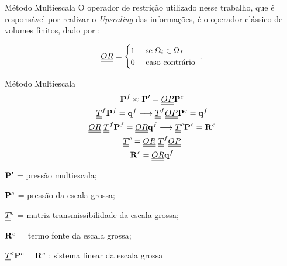 \documentclass[professionalfont]{beamer}
\begin{document}


\begin{frame}{Método Multiescala}
    O operador de restrição utilizado nesse trabalho, que é responsável por realizar o \textit{Upscaling} das informações, é o operador clássico de volumes finitos, dado por \cite{Tene_2016}:

    \begin{equation}
        \label{eq:multiescala.11}
        \underline{\underline{OR}} = 
        \begin{cases}
            1 & \text{ se } \Omega_{i} \in \Omega_{I}\\
            0 & \text{ caso contrário }
        \end{cases}.
    \end{equation}
\end{frame}

\begin{frame}{Método Multiescala}
    \small
    \begin{gather*}
        \mathbf{P}^{f} \approx \bold{P}' = \underline{\underline{OP}} \bold{P}^{c} \\
        \underline{\underline{T}}^{f} \mathbf{P}^{f} = \mathbf{q}^{f}  \longrightarrow \underline{\underline{T}}^{f} \underline{\underline{OP}} \bold{P}^{c} = \mathbf{q}^{f} \\
        \underline{\underline{OR}} \hspace{0.1cm} \underline{\underline{T}}^{f} \mathbf{P}^{f} = \underline{\underline{OR}} \mathbf{q}^{f}  \longrightarrow \underline{\underline{T}}^{c} \bold{P}^{c} = \bold{R}^{c} \\
        \underline{\underline{T}}^{c} = \underline{\underline{OR}} \hspace{0.1cm} \underline{\underline{T}}^{f} \underline{\underline{OP}} \\
        \bold{R}^{c} = \underline{\underline{OR}} \mathbf{q}^{f}
    \end{gather*}

    \begin{description}[]
        \item $\bold{P}'$ = pressão multiescala;
        \item $\bold{P}^{c}$ = pressão da escala grossa;
        \item $\underline{\underline{T}}^{c}$ = matriz transmissibilidade da escala grossa;
        \item $\bold{R}^{c}$ = termo fonte da escala grossa;
        \item $\underline{\underline{T}}^{c} \bold{P}^{c} = \bold{R}^{c}$ : sistema linear da escala grossa
    \end{description}
\end{frame}
\end{document}
